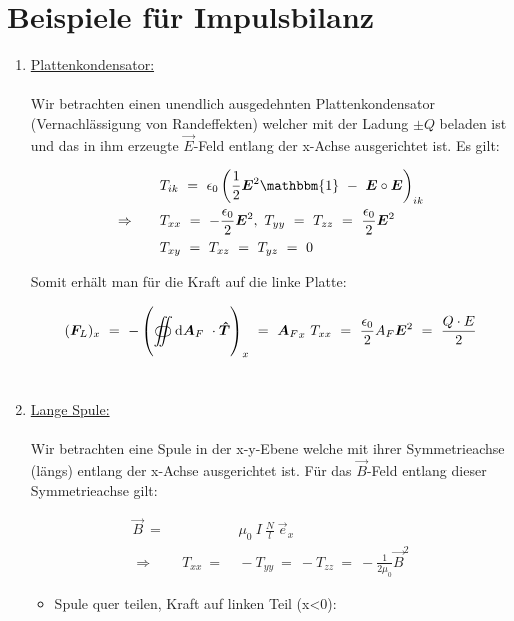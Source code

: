 \section{Beispiele für Impulsbilanz}

\begin{enumerate}[label=\roman*)]
	\item \underline{Plattenkondensator:}\\
	\ \\
	Wir betrachten einen unendlich ausgedehnten Plattenkondensator (Vernachlässigung von Randeffekten) welcher mit der Ladung $\pm Q$ beladen ist und das in ihm erzeugte $\vec{E}$-Feld entlang der x-Achse ausgerichtet ist. Es gilt:
	
	\begin{align*}
	& T_{ik} \ = \ \epsilon_0 \left(\frac{1}{2}\vec{E}^2\mathbbm{1} \ - \ \vec{E}\circ\vec{E}\right)_{ik}\\
	\Rightarrow \qquad & T_{xx} \ = \ -\frac{\epsilon_0}{2}\vec{E}^2, \ T_{yy} \ = \ T_{zz} \ = \ \frac{\epsilon_0}{2} \vec{E}^2\\
	& T_{xy} \ = \ T_{xz} \ = \ T_{yz} \ = \ 0
	\end{align*}
	
	Somit erhält man für die Kraft auf die linke Platte:
	
	\begin{equation*}
	(\vec{F}_L)_x \ = \ - \left( \Oiint{}{}{\vec{A}_F} \cdot \tens{T}\right)_x \ = \ {\vec{A}_F}_x \ T_{xx} \ = \ \frac{\epsilon_0}{2} A_F \vec{E}^2 \ = \ \frac{Q\cdot E}{2}  
	\end{equation*}
	\ \\
	\item \underline{Lange Spule:}\\
	\ \\
	Wir betrachten eine Spule in der x-y-Ebene welche mit ihrer Symmetrieachse (längs) entlang der x-Achse ausgerichtet ist.
	Für das $\vec{B}$-Feld entlang dieser Symmetrieachse gilt:
	
	\begin{align*}
	\vec{B} \ =& \ \mu_0 \ I \ \frac{N}{l} \ \vec{e}_x\\
	\Rightarrow \qquad T_{xx} \ =& \ - T_{yy} \ = \ -T_{zz} \ = \ - \frac{1}{2\mu_0}\vec{B}^2
	\end{align*}
	
	\begin{itemize}
		\item Spule quer teilen, Kraft auf linken Teil (x<0):
		

\end{itemize}
\end{enumerate}
